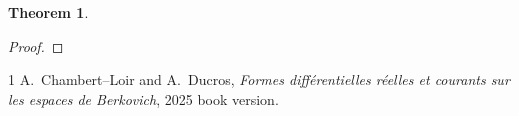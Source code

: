 \documentclass[11pt]{article}
\newtheorem{theorem}{Theorem}
\begin{document}
\begin{theorem}\label{thm:p072-omega1}

\end{theorem}
\begin{proof}

\end{proof}
\begin{thebibliography}{1}
A.~Chambert--Loir and A.~Ducros,
\emph{Formes diff\'erentielles r\'eelles et courants sur les espaces de
  Berkovich}, 2025 book version.
\end{thebibliography}
\end{document}
